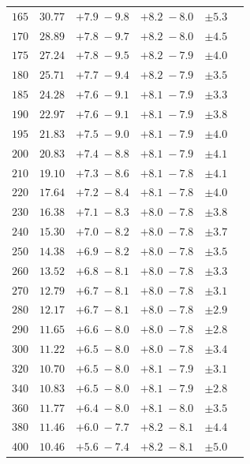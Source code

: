 \begin{table}[!h]
\begin{center}
\begin{tabular}{cccccc}
$165$ & $30.77$ & ${ +7.9 \; -9.8 }$ & ${ +8.2\; -8.0}$ & ${\pm 5.3 } $ \\  
$170$ & $28.89$ & ${ +7.8 \; -9.7 }$ & ${ +8.2\; -8.0}$ & ${\pm 4.5 } $  \\  
$175$ & $27.24$ & ${ +7.8 \; -9.5 }$ & ${ +8.2\; -7.9}$ & ${\pm 4.0 } $  \\  
$180$ & $25.71$ & ${ +7.7 \; -9.4 }$ & ${ +8.2\; -7.9}$ & ${\pm 3.5 } $  \\  
$185$ & $24.28$ & ${ +7.6 \; -9.1 }$ & ${ +8.1\; -7.9}$ & ${\pm 3.3 } $  \\  
$190$ & $22.97$ & ${ +7.6 \; -9.1 }$ & ${ +8.1\; -7.9}$ & ${\pm 3.8 } $ \\  
$195$ & $21.83$ & ${ +7.5 \; -9.0 }$ & ${ +8.1\; -7.9}$ & ${\pm 4.0 } $ \\  
$200$ & $20.83$ & ${ +7.4 \; -8.8 }$ & ${ +8.1\; -7.9}$ & ${\pm 4.1 } $ \\  
$210$ & $19.10$ & ${ +7.3 \; -8.6 }$ & ${ +8.1\; -7.8}$ & ${\pm 4.1 } $  \\  
$220$ & $17.64$ & ${ +7.2 \; -8.4 }$ & ${ +8.1\; -7.8}$ & ${\pm 4.0 } $  \\  
$230$ & $16.38$ & ${ +7.1 \; -8.3 }$ & ${ +8.0\; -7.8}$ & ${\pm 3.8 } $ \\  
$240$ & $15.30$ & ${ +7.0 \; -8.2 }$ & ${ +8.0\; -7.8}$ & ${\pm 3.7 } $  \\  
$250$ & $14.38$ & ${ +6.9 \; -8.2 }$ & ${ +8.0\; -7.8}$ & ${\pm 3.5 } $  \\  
$260$ & $13.52$ & ${ +6.8 \; -8.1 }$ & ${ +8.0\; -7.8}$ & ${\pm 3.3 } $ \\  
$270$ & $12.79$ & ${ +6.7 \; -8.1 }$ & ${ +8.0\; -7.8}$ & ${\pm 3.1 } $  \\  
$280$ & $12.17$ & ${ +6.7 \; -8.1 }$ & ${ +8.0\; -7.8}$ & ${\pm 2.9 } $ \\  
$290$ & $11.65$ & ${ +6.6 \; -8.0 }$ & ${ +8.0\; -7.8}$ & ${\pm 2.8 } $  \\  
$300$ & $11.22$ & ${ +6.5 \; -8.0 }$ & ${ +8.0\; -7.8}$ & ${\pm 3.4 } $  \\  
$320$ & $10.70$ & ${ +6.5 \; -8.0 }$ & ${ +8.1\; -7.9}$ & ${\pm 3.1 } $ \\  
$340$ & $10.83$ & ${ +6.5 \; -8.0 }$ & ${ +8.1\; -7.9}$ & ${\pm 2.8 } $ \\  
$360$ & $11.77$ & ${ +6.4 \; -8.0 }$ & ${ +8.1\; -8.0}$ & ${\pm 3.5 } $  \\  
$380$ & $11.46$ & ${ +6.0 \; -7.7 }$ & ${ +8.2\; -8.1}$ & ${\pm 4.4 } $ \\  
$400$ & $10.46$ & ${ +5.6 \; -7.4 }$ & ${ +8.2\; -8.1}$ & ${\pm 5.0 } $ \\  

\end{tabular}
\end{center}
\end{table}

